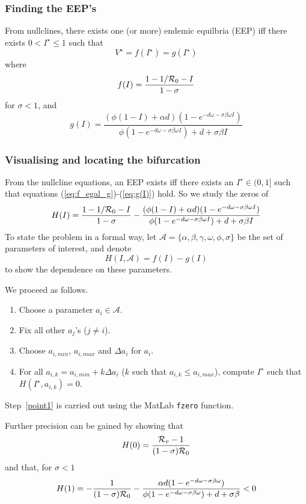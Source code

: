 \documentclass[aspectratio=169]{beamer}\usepackage[]{graphicx}\usepackage[]{xcolor}
\begin{document}
\begin{frame}\frametitle{Finding the EEP's}
From nullclines, there exists one (or more) endemic equilbria
(EEP) iff there exists $0<I^\star\leq 1$ such that
\begin{equation}
 V^\star=f(I^\star)=g(I^\star)
 \label{eq:f_egal_g}
\end{equation}
where
\begin{equation}
 f(I)=\frac{1-1/\mathcal{R}_0-I}{1-\sigma}
 \label{eq:f(I)}
\end{equation}
for $\sigma<1$, and
\begin{equation}
 g(I)=\frac{(\phi(1-I)+\alpha d)(1-e^{-d\omega-\sigma\beta\omega I})}
 {\phi(1-e^{-d\omega-\sigma\beta\omega I})+d+\sigma\beta I}
 \label{eq:g(I)}
\end{equation}
\end{frame}


\begin{frame}\frametitle{Visualising and locating the bifurcation}
From the nullcline equations, an EEP exists iff there exists an
$I^\star\in(0,1]$ such that equations (\ref{eq:f_egal_g})-(\ref{eq:g(I)})
hold.
So we study the zeros of
\[
H(I)=\frac{1-1/\mathcal{R}_0-I}{1-\sigma} -
\frac{(\phi(1-I)+\alpha d)(1-e^{-d\omega-\sigma\beta\omega I})}
{\phi(1-e^{-d\omega-\sigma\beta\omega I})+d+\sigma\beta I}
\]
To state the problem in a formal way, let
$\mathcal{A}=\{\alpha,\beta,\gamma,\omega,\phi,\sigma\}$ be the set of
parameters of interest, and denote
\begin{equation}
H(I,\mathcal{A})=
f(I)-g(I)
\label{eq:H}
\end{equation}
to show the dependence on these parameters.
\end{frame}

\begin{frame}
We proceed as follows.
\begin{enumerate}
\item Choose a parameter $a_i\in\mathcal{A}$.
\item Fix all other $a_j$'s ($j\neq i$).
\item Choose $a_{i,min}$, $a_{i,max}$ and
 $\Delta a_i$ for $a_i$.
\item For all
  $a_{i,k}=a_{i,min}+k\Delta a_i$ ($k$
  such that $a_{i,k}\leq a_{i,max}$), compute
  $I^\star$ such that $H(I^\star,a_{i,k})=0$. \label{point1}
\end{enumerate}
Step~\ref{point1} is carried out using the {\sc MatLab} {\tt fzero}
function.

Further precision can be gained by showing that
\[
H(0)=\frac{\mathcal{R}_v-1}{(1-\sigma)\mathcal{R}_0}
\]
and that, for $\sigma<1$
\[
H(1)=-\frac{1}{(1-\sigma)\mathcal{R}_0}-\frac{\alpha
d(1-e^{-d\omega-\sigma\beta\omega})}{\phi(1
-e^{-d\omega-\sigma\beta\omega})+d+\sigma\beta}<0
\]
\end{frame}
\end{document}

